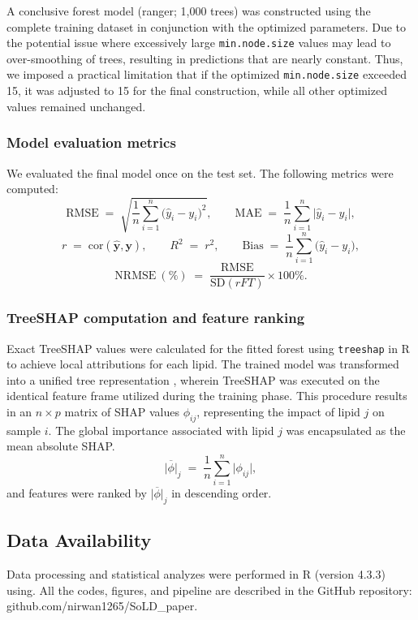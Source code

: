 \documentclass[10pt,letterpaper]{article}
\begin{document}
\begin{itemize}
A conclusive forest model (ranger; 1,000 trees) was constructed using the complete training dataset in conjunction with the optimized parameters. Due to the potential issue where excessively large \texttt{min.node.size} values may lead to over-smoothing of trees, resulting in predictions that are nearly constant. Thus, we imposed a practical limitation that if the optimized \texttt{min.node.size} exceeded 15, it was adjusted to 15 for the final construction, while all other optimized values remained unchanged.

\subsubsection*{Model evaluation metrics}
We evaluated the final model once on the test set. The following metrics were computed:
\[
\mathrm{RMSE} \;=\; \sqrt{\frac{1}{n}\sum_{i=1}^{n}\bigl(\hat{y}_i - y_i\bigr)^2}, 
\qquad
\mathrm{MAE} \;=\; \frac{1}{n}\sum_{i=1}^{n}\bigl|\hat{y}_i - y_i\bigr|,
\]
\[
r \;=\; \mathrm{cor}(\hat{\bm{y}}, \bm{y}), 
\qquad
R^2 \;=\; r^2,
\qquad
\mathrm{Bias} \;=\; \frac{1}{n}\sum_{i=1}^{n}\bigl(\hat{y}_i - y_i\bigr),
\]
\[
\mathrm{NRMSE}~(\%) \;=\; \frac{\mathrm{RMSE}}{\mathrm{SD}(rFT)} \times 100\%.
\]

\subsubsection*{TreeSHAP computation and feature ranking}
Exact TreeSHAP values were calculated for the fitted forest using \texttt{treeshap} in R to achieve local attributions for each lipid. The trained model was transformed into a unified tree representation , wherein TreeSHAP was executed on the identical feature frame utilized during the training phase. This procedure results in an \(n \times p\) matrix of SHAP values \(\phi_{ij}\), representing the impact of lipid \(j\) on sample \(i\). The global importance associated with lipid \(j\) was encapsulated as the mean absolute SHAP.\[
\overline{|\phi|}_j \;=\; \frac{1}{n}\sum_{i=1}^{n} \bigl|\phi_{ij}\bigr|,
\]
and features were ranked by \(\overline{|\phi|}_j\) in descending order.




\subsection*{Data Availability}
Data processing and statistical analyzes were performed in R (version 4.3.3) using. All the codes, figures, and pipeline are described in the GitHub repository: github.com/nirwan1265/SoLD\_paper.


\end{itemize}
\end{document}
